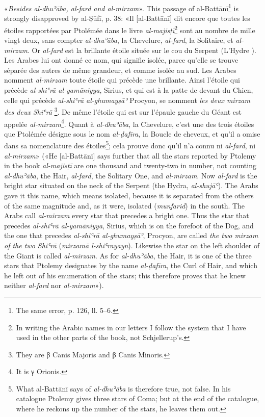 \documentclass[11pt]{article}
\begin{document}
\par «\emph{Besides al-dhuʾāba, al-fard and al-mirzam}». This passage of al-Battānī\footnote{The same error, p. 126, ll. 5–6.} is strongly disapproved by al-Ṣūfī, p. 38: «Il [al-Battānī] dit encore que toutes les étoiles rapportées par Ptolémée dans le livre \emph{al-majisṭī}\footnote{In writing the Arabic names in our letters I follow the system that I have used in the other parts of the book, not Schjellerup's.} sont au nombre de mille vingt deux, sans compter \emph{al-dhuʾāba}, la Chevelure, \emph{al-fard}, la Solitaire, et \emph{al-mirzam}. Or \emph{al-fard} est la brillante étoile située sur le cou du Serpent (L’Hydre ). Les Arabes lui ont donné ce nom, qui signifie isolée, parce qu’elle se trouve séparée des autres de même grandeur, et comme isolée  au sud. Les Arabes nomment \emph{al-mirzam} toute étoile qui précède une brillante. Ainsi l’étoile qui précède \emph{al-shiʿrā al-yamāniyya}, Sirius, et qui est à la patte de devant du Chien, celle qui précède \emph{al-shiʿrā al-ghumayṣāʾ} Procyon, se nomment \emph{les deux mirzam des deux Shiʿrā} \footnote{They are {\greekfont β} Canis Majoris and {\greekfont β} Canis Minoris.}. De même l’étoile qui est sur l’épaule gauche du Géant est appelée \emph{al-mirzam}\footnote{It is {\greekfont γ} Orionis.}. Quant à \emph{al-dhuʾāba}, la Chevelure, c’est une des trois étoiles que Ptolémée désigne sous le nom \emph{al-ḍafīra}, la Boucle de cheveux, et qu’il a omise dans sa nomenclature des étoiles\footnote{What al-Battānī says of \emph{al-dhuʾāba} is therefore true, not false. In his catalogue Ptolemy gives three stars of Coma; but at the end of the catalogue, where he reckons up the number of the stars, he leaves them out.}; cela prouve donc qu’il n’a connu ni \emph{al-fard}, ni \emph{al-mirzam}» («He [al-Battānī] says further that all the stars reported by Ptolemy in the book \emph{al-majisṭī} are one thousand and twenty-two in number, not counting \emph{al-dhuʾāba}, the Hair, \emph{al-fard}, the Solitary One, and \emph{al-mirzam}. Now \emph{al-fard} is the bright star situated on the neck of the Serpent (the Hydra, \emph{al-shujāʿ}). The Arabs gave it this name, which means isolated, because it is separated from the others of the same magnitude and, as it were, isolated (\emph{munfarid}) in the south. The Arabs call \emph{al-mirzam} every star that precedes a bright one. Thus the star that precedes \emph{al-shiʿrā al-yamāniyya}, Sirius, which is on the forefoot of the Dog, and the one that precedes \emph{al-shiʿrā al-ghumayṣāʾ}, Procyon, are called \emph{the two mirzam of the two Shiʿrā} (\emph{mirzamā l-shiʿrayayn}). Likewise the star on the left shoulder of the Giant is called \emph{al-mirzam}. As for \emph{al-dhuʾāba}, the Hair, it is one of the three stars that Ptolemy designates by the name \emph{al-ḍafīra}, the Curl of Hair, and which he left out of his enumeration of the stars; this therefore proves that he knew neither \emph{al-fard} nor \emph{al-mirzam}»).\par
\end{document}
